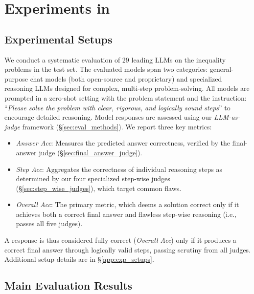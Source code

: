 \vspace{-2mm}
\section{Experiments in \dataset}
\label{sec:experiments}
\vspace{-3mm}

\subsection{Experimental Setups}
\label{sec:exp_setups}
\vspace{-2mm}

We conduct a systematic evaluation of 29 leading LLMs on the inequality problems in the \dataset test set. The evaluated models span two categories: general-purpose chat models (both open-source and proprietary) and specialized reasoning LLMs designed for complex, multi-step problem-solving. All models are prompted in a zero-shot setting with the problem statement and the instruction: ``\textit{Please solve the problem with clear, rigorous, and logically sound steps}'' to encourage detailed reasoning.
Model responses are assessed using our \textit{LLM-as-judge} framework (\S\ref{sec:eval_methods}). We report three key metrics:
\vspace{-2mm}
\begin{itemize}        %
\item \textit{Answer Acc}: Measures the predicted answer correctness, verified by the final-answer judge (\S\ref{sec:final_answer_judge}).
\item \textit{Step Acc}: Aggregates the correctness of individual reasoning steps as determined by our four specialized step-wise judges (\S\ref{sec:step_wise_judges}), which target common flaws.
\item \textit{Overall Acc}: The primary metric, which deems a solution correct only if it achieves both a correct final answer and flawless step-wise reasoning (i.e., passes all five judges).
\end{itemize}
\vspace{-2mm}
A response is thus considered fully correct (\textit{Overall Acc}) only if it produces a correct final answer through logically valid steps, passing scrutiny from all judges. Additional setup details are in \S\ref{app:exp_setups}.

\vspace{-2mm}
\subsection{Main Evaluation Results}
\label{sec:evaluation_results}
\vspace{-3mm}

